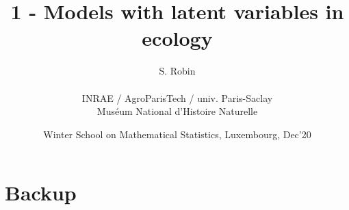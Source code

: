 \documentclass[8pt]{beamer}
\newcommand{\figlux}{./Figures}
\begin{document}
\title{1 - Models with latent variables in ecology}

\author[S. Robin]{S. Robin \\ ~\\
  {\small INRAE / AgroParisTech / univ. Paris-Saclay \\
  Mus\'eum National d'Histoire Naturelle}
  }

\date[Luxembourg, Dec'20]{Winter School on Mathematical Statistics, Luxembourg, Dec'20}

\maketitle











\backupbegin 
\section*{Backup}

% 

\backupend 

\end{document}
